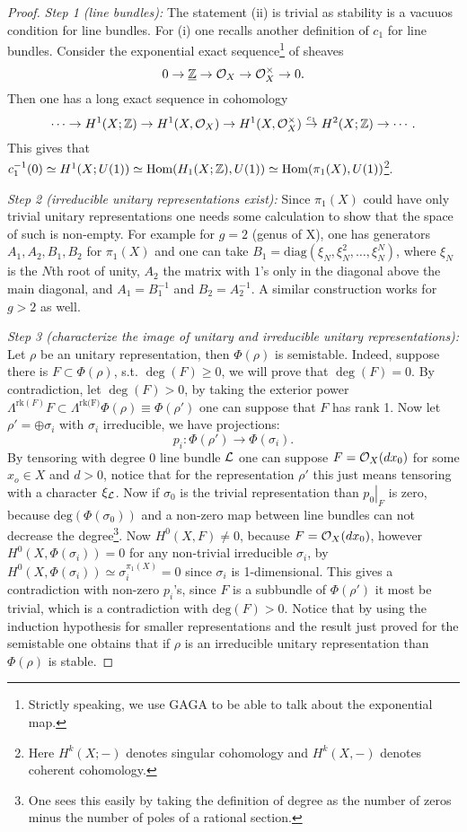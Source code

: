\begin{proof}
\textit{Step 1 (line bundles):} The statement (ii) is trivial as stability is a
vacuuos condition for line bundles.
For (i) one recalls another definition of $c_1$ for line
bundles. Consider the exponential exact sequence\footnote{Strictly
  speaking, we use GAGA to be able to talk about the exponential map.}
of sheaves
\[0 \rightarrow \underline{\mathbb{Z}} \rightarrow \mathcal{O}_X \rightarrow \mathcal{O}^{\times}_X 
\rightarrow 0.\]
Then one has a long exact sequence in cohomology
\[\cdots \rightarrow H^1(X;\mathbb{Z}) \rightarrow H^1(X,\mathcal{O}_X) \rightarrow H^1(X,\mathcal{O}^{\times}_X)
\overset{c_1}{\rightarrow} H^2(X;\mathbb{Z}) \rightarrow \cdots.\]
This gives that $c^{-1}_1(0) \simeq H^1(X;U(1)) \simeq
\mbox{Hom}(H_1(X;\mathbb{Z}),U(1)) \simeq \mbox{Hom}(\pi_1(X),U(1))$\footnote{Here
  $H^k(X;-)$ denotes singular cohomology and $H^k(X,-)$ denotes
  coherent cohomology.}.

\textit{Step 2 (irreducible unitary representations exist):} Since
$\pi_1(X)$ could have only trivial unitary representations one needs some
calculation to show that the space of such is non-empty. For example
for $g=2$ (genus of X), one has generators $A_1,A_2,B_1,B_2$ for
$\pi_1(X)$ and one can take $B_1 =
\mbox{diag}(\xi_N,\xi^2_N,\ldots,\xi^N_N)$, where $\xi_N$ is the $N$th
root of unity, $A_2$ the matrix with $1$'s only in the diagonal above
the main diagonal, and $A_1=B^{-1}_1$ and $B_2 = A^{-1}_2$. A similar
construction works for $g > 2$ as well.

\textit{Step 3 (characterize the image of unitary and irreducible unitary
representations):} Let $\rho$ be an unitary representation, then
$\Phi(\rho)$ is semistable. Indeed, suppose there is $F \subset
\Phi(\rho)$, s.t. $\deg(F) \geq 0$, we will prove that $\deg(F) =
0$. By contradiction, let $\deg(F) > 0$, by taking the exterior power
$\Lambda^{\mbox{rk}(F)}F \subset \Lambda^{\mbox{rk(F)}}\Phi(\rho)
\equiv \Phi(\rho')$ one can suppose that $F$ has rank 1. Now let
$\rho' = \oplus \sigma_i$ with $\sigma_i$ irreducible, we have
projections:
\[p_i: \Phi(\rho') \rightarrow \Phi(\sigma_i).\]
By tensoring with degree $0$ line bundle $\mathcal{L}$ one can suppose $F =
\mathcal{O}_X(dx_0)$ for some $x_o \in X$ and $d>0$, notice that for the
representation $\rho'$ this just means tensoring with a character
$\xi_{\mathcal{L}}$. Now if $\sigma_0$ is the trivial representation than
$\left.p_0\right|_F$ is zero, because $\mbox{deg}(\Phi(\sigma_0))$ and a
non-zero map between line bundles can not decrease the
degree\footnote{One sees this easily by taking the definition of
  degree as the number of zeros minus the number of poles of a rational section.}. Now
$H^0(X,F)\neq 0$, because $F=\mathcal{O}_X(dx_0)$, however
$H^0(X,\Phi(\sigma_i)) = 0$ for any non-trivial irreducible
$\sigma_i$, by $H^0(X,\Phi(\sigma_i)) \simeq \sigma^{\pi_1(X)}_i = 0$
since $\sigma_i$ is 1-dimensional. This gives a contradiction with
non-zero $p_i$'s, since $F$ is a subbundle of $\Phi(\rho')$ it most be
trivial, which is a contradiction with $\mbox{deg}(F)>0$.
Notice that by using the induction hypothesis for smaller
representations and the result just proved for the semistable one
obtains that if $\rho$ is an irreducible unitary representation than
$\Phi(\rho)$ is stable.


\end{proof}
